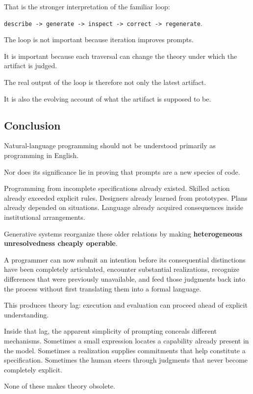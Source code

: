 \documentclass[
]{article}
\begin{document}
That is the stronger interpretation of the familiar loop:

\texttt{describe\ -\textgreater{}\ generate\ -\textgreater{}\ inspect\ -\textgreater{}\ correct\ -\textgreater{}\ regenerate}.

The loop is not important because iteration improves prompts.

It is important because each traversal can change the theory under which
the artifact is judged.

The real output of the loop is therefore not only the latest artifact.

It is also the evolving account of what the artifact is supposed to be.

\subsection{Conclusion}\label{conclusion}

Natural-language programming should not be understood primarily as
programming in English.

Nor does its significance lie in proving that prompts are a new species
of code.

Programming from incomplete specifications already existed. Skilled
action already exceeded explicit rules. Designers already learned from
prototypes. Plans already depended on situations. Language already
acquired consequences inside institutional arrangements.

Generative systems reorganize these older relations by making
\textbf{heterogeneous unresolvedness cheaply operable}.

A programmer can now submit an intention before its consequential
distinctions have been completely articulated, encounter substantial
realizations, recognize differences that were previously unavailable,
and feed those judgments back into the process without first translating
them into a formal language.

This produces theory lag: execution and evaluation can proceed ahead of
explicit understanding.

Inside that lag, the apparent simplicity of prompting conceals different
mechanisms. Sometimes a small expression locates a capability already
present in the model. Sometimes a realization supplies commitments that
help constitute a specification. Sometimes the human steers through
judgments that never become completely explicit.

None of these makes theory obsolete.
\end{document}
